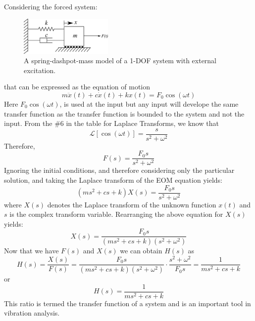 \documentclass[12pt,letter]{article}
\numberwithin{ex}{section} %
\numberwithin{re}{section} %
\newcommand{\Laplace}[1]{\ensuremath{\mathcal{L}{\left[#1\right]}}}
\numberwithin{equation}{section}	%
\begin{document}
Considering the forced system:
\begin{figure}[H]
	\centering
	\includegraphics[width=0.4\textwidth]{../figures/1-DOF-spring_dashpot_mass_horizontal_forced.png}
	\caption{A spring-dashpot-mass model of a 1-DOF system with external excitation.}
\end{figure}
\noindent that can be expressed as the equation of motion
\begin{equation}
	m\ddot{x}(t) + c\dot{x}(t) +kx(t) = F_0 \cos(\omega t)
\end{equation}
Here $F_0 \cos(\omega t)$, is used at the input but any input will develope the same transfer function as the transfer function is bounded to the system and not the input. From the \#6 in the table for Laplace Transforms, we know that
\begin{equation}
	\Laplace{\cos(\omega t)} = \frac{s}{s^2+\omega^2}
\end{equation}
Therefore, 
\begin{equation}
F(s) = \frac{F_0s}{s^2+\omega^2}
\end{equation}
Ignoring the initial conditions, and therefore considering only the particular solution, and taking the Laplace transform of the EOM equation yields:
\begin{equation}
(ms^2 + cs +k)X(s) = \frac{F_0s}{s^2+\omega^2} 
\end{equation}
where $X(s)$ denotes the Laplace transform of the unknown function $x(t)$ and $s$ is the complex transform variable. Rearranging the above equation for $X(s)$ yields: 
\begin{equation}
X(s) = \frac{F_0s}{(ms^2 + cs +k)(s^2+\omega^2)}
\end{equation}
Now that we have $F(s)$ and $X(s)$ we can obtain $H(s)$ as  
\begin{equation}
H(s) = \frac{X(s)}{F(s)} = \frac{F_0s}{(ms^2 + cs +k)(s^2+\omega^2)} \cdot \frac{s^2+\omega^2}{F_0s} = \frac{1}{ms^2+cs+k}
\end{equation}
or 
\begin{equation}
H(s) = \frac{1}{ms^2+cs+k}
\end{equation}
This ratio is termed the transfer function of a system and is an important tool in vibration analysis.
\end{document}
